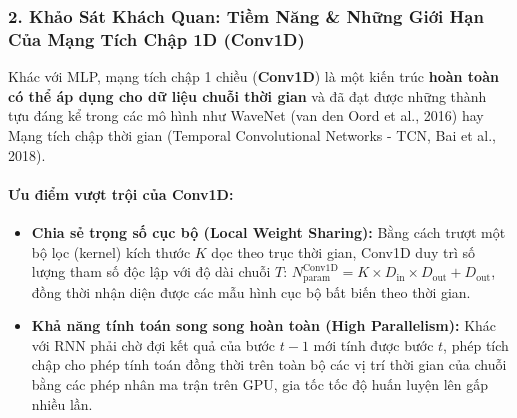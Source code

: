 \documentclass[12pt,a4paper]{report}
\begin{document}
\subsubsection{2. Khảo Sát Khách Quan: Tiềm Năng \& Những Giới Hạn Của Mạng Tích Chập 1D (Conv1D)}
Khác với MLP, mạng tích chập 1 chiều (\textbf{Conv1D}) là một kiến trúc \textbf{hoàn toàn có thể áp dụng cho dữ liệu chuỗi thời gian} và đã đạt được những thành tựu đáng kể trong các mô hình như WaveNet (van den Oord et al., 2016) hay Mạng tích chập thời gian (Temporal Convolutional Networks - TCN, Bai et al., 2018).

\paragraph{Ưu điểm vượt trội của Conv1D:}
\begin{itemize}
    \item \textbf{Chia sẻ trọng số cục bộ (Local Weight Sharing):} Bằng cách trượt một bộ lọc (kernel) kích thước $K$ dọc theo trục thời gian, Conv1D duy trì số lượng tham số độc lập với độ dài chuỗi $T$: $N_{\text{param}}^{\text{Conv1D}} = K \times D_{\text{in}} \times D_{\text{out}} + D_{\text{out}}$, đồng thời nhận diện được các mẫu hình cục bộ bất biến theo thời gian.
    \item \textbf{Khả năng tính toán song song hoàn toàn (High Parallelism):} Khác với RNN phải chờ đợi kết quả của bước $t-1$ mới tính được bước $t$, phép tích chập cho phép tính toán đồng thời trên toàn bộ các vị trí thời gian của chuỗi bằng các phép nhân ma trận trên GPU, gia tốc tốc độ huấn luyện lên gấp nhiều lần.
\end{itemize}
\end{document}
